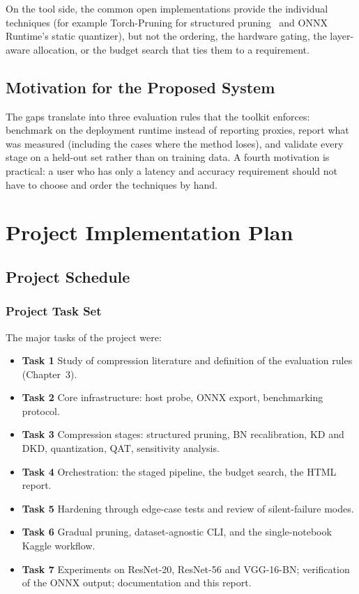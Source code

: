 \documentclass[oneside,a4paper,12pt]{report}
\begin{document}
On the tool side, the common open implementations provide the individual techniques (for example Torch-Pruning for structured pruning~\cite{fang2023} and ONNX Runtime's static quantizer), but not the ordering, the hardware gating, the layer-aware allocation, or the budget search that ties them to a requirement.

\section{Motivation for the Proposed System}
The gaps translate into three evaluation rules that the toolkit enforces: benchmark on the deployment runtime instead of reporting proxies, report what was measured (including the cases where the method loses), and validate every stage on a held-out set rather than on training data. A fourth motivation is practical: a user who has only a latency and accuracy requirement should not have to choose and order the techniques by hand.

\chapter{Project Implementation Plan}
\section{Project Schedule}
\subsection{Project Task Set}
The major tasks of the project were:
\begin{itemize}
\item \textbf{Task 1} Study of compression literature and definition of the evaluation rules (Chapter~3).
\item \textbf{Task 2} Core infrastructure: host probe, ONNX export, benchmarking protocol.
\item \textbf{Task 3} Compression stages: structured pruning, BN recalibration, KD and DKD, quantization, QAT, sensitivity analysis.
\item \textbf{Task 4} Orchestration: the staged pipeline, the budget search, the HTML report.
\item \textbf{Task 5} Hardening through edge-case tests and review of silent-failure modes.
\item \textbf{Task 6} Gradual pruning, dataset-agnostic CLI, and the single-notebook Kaggle workflow.
\item \textbf{Task 7} Experiments on ResNet-20, ResNet-56 and VGG-16-BN; verification of the ONNX output; documentation and this report.
\end{itemize}
\end{document}

